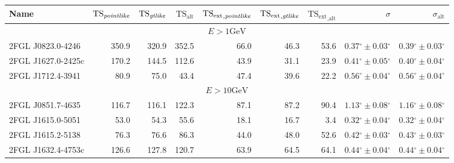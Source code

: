 \documentclass[12pt,preprint]{aastex}
\newcommand{\gev}{\text{GeV}\xspace}
\newcommand{\tsext}{{\ensuremath{\text{TS}_\text{ext}}}\xspace}
\newcommand{\tsextpointlike}{\ensuremath{\tsext_{,\pointlike}}\xspace}
\newcommand{\tsextgtlike}{\ensuremath{\tsext_{,\gtlike}}\xspace}
\newcommand{\tsextalt}{\ensuremath{\tsext_{,\alt}}\xspace}
\newcommand{\ts}{\text{TS}\xspace}
\newcommand{\alt}{\text{alt}\xspace}
\renewcommand{\deg}{\ensuremath{^\circ}\xspace}
\newcommand{\pointlike}{\text{\em pointlike}\xspace}
\newcommand{\gtlike}{\text{\em gtlike}\xspace}
\begin{document}
  \clearpage
  \begin{table}
    \begin{centering}
      \begin{tabular}{l|rrrrrrrr}
        \hline
        \hline
        Name                 &     $\ts_\pointlike$ &        $\ts_\gtlike$ &           $\ts_\alt$ &          \tsextpointlike &           \tsextgtlike &            \tsextalt &                    $\sigma$ &               $\sigma_\alt$ \\
        \hline
        \multicolumn{9}{c}{$E > 1 \gev$} \\
        \hline
        2FGL J0823.0-4246    &                350.9 &                320.9 &                352.5 &                     66.0 &                   46.3 &                 53.6 & $  0.37\deg \pm   0.03\deg$ & $  0.39\deg \pm   0.03\deg$ \\
        2FGL J1627.0-2425c   &                170.2 &                144.5 &                112.6 &                     43.9 &                   31.1 &                 23.9 & $  0.41\deg \pm   0.05\deg$ & $  0.40\deg \pm   0.04\deg$ \\
        2FGL J1712.4-3941    &                 80.9 &                 75.0 &                 43.4 &                     47.4 &                   39.6 &                 22.2 & $  0.56\deg \pm   0.04\deg$ & $  0.56\deg \pm   0.04\deg$ \\
        \hline
        \multicolumn{9}{c}{$E > 10 \gev$} \\
        \hline
        2FGL J0851.7-4635    &                116.7 &                116.1 &                122.3 &                     87.1 &                   87.2 &                 90.4 & $  1.13\deg \pm   0.08\deg$ & $  1.16\deg \pm   0.08\deg$ \\
        2FGL J1615.0-5051    &                 53.0 &                 54.3 &                 55.6 &                     18.1 &                   16.7 &                  3.4 & $  0.32\deg \pm   0.04\deg$ & $  0.32\deg \pm   0.04\deg$ \\
        2FGL J1615.2-5138    &                 76.3 &                 76.6 &                 86.3 &                     44.0 &                   48.0 &                 52.6 & $  0.42\deg \pm   0.03\deg$ & $  0.43\deg \pm   0.03\deg$ \\
        2FGL J1632.4-4753c   &                126.6 &                127.8 &                120.7 &                     63.9 &                   64.5 &                 64.1 & $  0.44\deg \pm   0.04\deg$ & $  0.44\deg \pm   0.04\deg$ \\

\end{tabular}
\end{centering}
\end{table}
\end{document}
